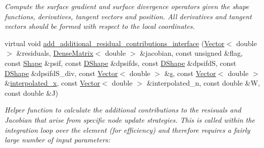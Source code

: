 \begin{DoxyCompactItemize}
\begin{DoxyCompactList}\small\item\em Compute the surface gradient and surface divergence operators given the shape functions, derivatives, tangent vectors and position. All derivatives and tangent vectors should be formed with respect to the local coordinates. \end{DoxyCompactList}\item 
virtual void \hyperlink{classoomph_1_1FluidInterfaceElement_a0bc278bb201b861f47dc846453be4c06}{add\+\_\+additional\+\_\+residual\+\_\+contributions\+\_\+interface} (\hyperlink{classoomph_1_1Vector}{Vector}$<$ double $>$ \&residuals, \hyperlink{classoomph_1_1DenseMatrix}{Dense\+Matrix}$<$ double $>$ \&jacobian, const unsigned \&flag, const \hyperlink{classoomph_1_1Shape}{Shape} \&psif, const \hyperlink{classoomph_1_1DShape}{D\+Shape} \&dpsifds, const \hyperlink{classoomph_1_1DShape}{D\+Shape} \&dpsifdS, const \hyperlink{classoomph_1_1DShape}{D\+Shape} \&dpsifd\+S\+\_\+div, const \hyperlink{classoomph_1_1Vector}{Vector}$<$ double $>$ \&\hyperlink{cfortran_8h_ab7123126e4885ef647dd9c6e3807a21c}{s}, const \hyperlink{classoomph_1_1Vector}{Vector}$<$ double $>$ \&\hyperlink{classoomph_1_1FaceElement_a7aa612fec3604e08344503fbcdc357c8}{interpolated\+\_\+x}, const \hyperlink{classoomph_1_1Vector}{Vector}$<$ double $>$ \&interpolated\+\_\+n, const double \&W, const double \&J)
\begin{DoxyCompactList}\small\item\em Helper function to calculate the additional contributions to the resisuals and Jacobian that arise from specific node update strategies. This is called within the integration loop over the element (for efficiency) and therefore requires a fairly large number of input parameters\+: \end{DoxyCompactList}\end{DoxyCompactItemize}
